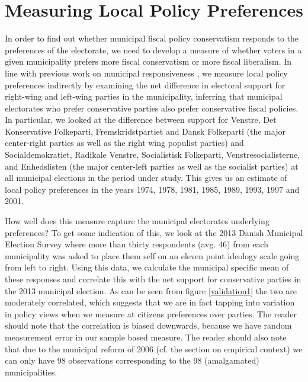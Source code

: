 \documentclass[a4paper,12pt]{article}
\begin{document}
\section{Measuring Local Policy Preferences}

In order to find out whether municipal fiscal policy conservatism responds to the preferences of the electorate, we need to develop a measure of whether voters in a given municipality prefers more fiscal conservatism or more fiscal liberalism. In line with previous work on municipal responsiveness \cite[e.g.,]{sances2017ideology,einstein2016pushing}, we measure local policy preferences indirectly by examining the net difference in electoral support for right-wing and left-wing parties in the municipality, inferring that municipal electorates who prefer conservative parties also prefer conservative fiscal policies. In particular, we looked at the difference between support for Venstre, Det Konservative Folkeparti, Fremskridstpartiet and Dansk Folkeparti (the major center-right parties as well as the right wing populist parties) and Socialdemokratiet, Radikale Venstre, Socialistisk Folkeparti, Venstresocialisterne, and Enhedslisten (the major center-left parties as well as the socialist parties) at all municipal elections in the period under study. This gives us an estimate of local policy preferences in the years 1974, 1978, 1981, 1985, 1989, 1993, 1997 and 2001. 

How well does this measure capture the municipal electorates underlying preferences? To get some indication of this, we look at the 2013 Danish Municipal Election Survey \cite{elklit2017kv13} where more than thirty respondents (avg. 46) from each municipality was asked to place them self on an eleven point ideology scale going from left to right. Using this data, we calculate the municipal specific mean of these responses and correlate this with the net support for conservative parties in the 2013 municipal election.  As can be seen from figure \ref{validation1} the two are moderately correlated, which suggests that we are in fact tapping into variation in policy views when we measure at citizens preferences over parties. The reader should note that the correlation is biased downwards, because we have random measurement error in our sample based measure. The reader should also note that due to the municipal reform of 2006 (cf. the section on empirical context) we can only have 98 observations corresponding to the 98 (amalgamated) municipalities.
\end{document}
